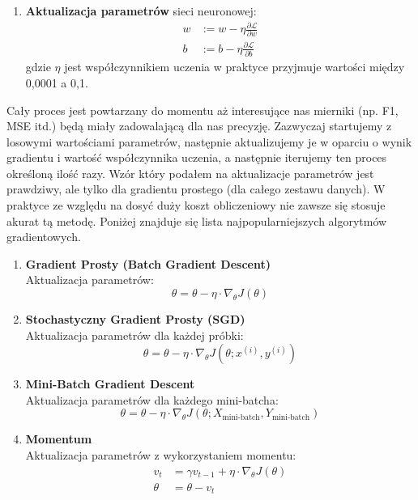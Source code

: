\begin{enumerate}
\begin{enumerate}[label=\textbf{Krok \arabic*:}]
    \item \textbf{Aktualizacja parametrów} sieci neuronowej:
    \begin{align*}
    w &:= w - \eta \frac{\partial \mathcal{L}}{\partial w} \\
    b &:= b - \eta \frac{\partial \mathcal{L}}{\partial b}
    \end{align*}
    gdzie \(\eta\) jest współczynnikiem uczenia w praktyce przyjmuje wartości między 0,0001 a 0,1.
\end{enumerate}
Cały proces jest powtarzany do momentu aż interesujące nas mierniki (np. F1, MSE itd.) będą miały zadowalającą dla nas precyzję. Zazwyczaj startujemy z losowymi wartościami parametrów, następnie aktualizujemy je w oparciu o wynik gradientu i wartość współczynnika uczenia, a następnie iterujemy ten proces określoną ilość razy. Wzór który podałem na aktualizacje parametrów jest prawdziwy, ale tylko dla gradientu prostego (dla całego zestawu danych). W praktyce ze względu na dosyć duży koszt obliczeniowy nie zawsze się stosuje akurat tą metodę. Poniżej znajduje się lista najpopularniejszych algorytmów gradientowych. 
\begin{enumerate}[label=\arabic*.]
    \item \textbf{Gradient Prosty (Batch Gradient Descent)}\\
    Aktualizacja parametrów:
    \[ \theta = \theta - \eta \cdot \nabla_\theta J(\theta) \]
    
    \item \textbf{Stochastyczny Gradient Prosty (SGD)}\\
    Aktualizacja parametrów dla każdej próbki:
    \[ \theta = \theta - \eta \cdot \nabla_\theta J(\theta; x^{(i)}, y^{(i)}) \]
    
    \item \textbf{Mini-Batch Gradient Descent}\\
    Aktualizacja parametrów dla każdego mini-batcha:
    \[ \theta = \theta - \eta \cdot \nabla_\theta J(\theta; X_{\text{mini-batch}}, Y_{\text{mini-batch}}) \]
    
    \item \textbf{Momentum}\\
    Aktualizacja parametrów z wykorzystaniem momentu:
    \begin{align*}
    v_t &= \gamma v_{t-1} + \eta \cdot \nabla_\theta J(\theta) \\
    \theta &= \theta - v_t
    \end{align*}
    

\end{enumerate}
\end{enumerate}
